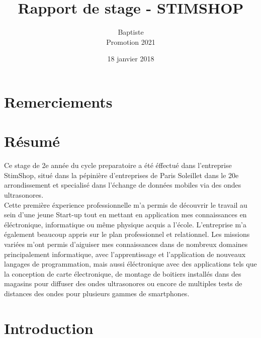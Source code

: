 \documentclass[12pt]{report}
\title{Rapport de stage - STIMSHOP}
\author{Baptiste \bsc{Pillet}\\Promotion 2021}
\date{18 janvier 2018}
\begin{document}
\maketitle


\chapter*{Remerciements}
\newpage
\chapter*{Résumé}
Ce stage de 2e ann\'ee du cycle preparatoire a \'et\'e \'effectu\'e dans l'entreprise StimShop, situ\'e dans la p\'epini\`ere d'entreprises de Paris Soleillet dans le 20e arrondissement et specialis\'e dans l'\'echange de donn\'ees mobiles via des ondes ultrasonores. \\

Cette premi\`ere \'experience professionnelle m'a permis de d\'ecouvrir le travail au sein d'une jeune Start-up tout en mettant en application mes connaissances en \'el\'ectronique, informatique ou m\^eme physique acquis a l'\'ecole. L'entreprise m'a \'egalement beaucoup appris sur le plan professionnel et relationnel. Les missions vari\'ees m'ont permis d'aiguiser mes connaissances dans de nombreux domaines principalement informatique, avec l'apprentissage et l'application de nouveaux langages de programmation, mais aussi \'el\'ectronique avec des applications tels que la conception de carte \'electronique, de montage de boitiers install\'es dans des magasins pour diffuser des ondes ultrasonores ou encore de multiples tests de distances des ondes pour plusieurs gammes de smartphones.


\newpage


\renewcommand{\contentsname}{Sommaire}
\tableofcontents

\chapter*{Introduction}
\end{document}
